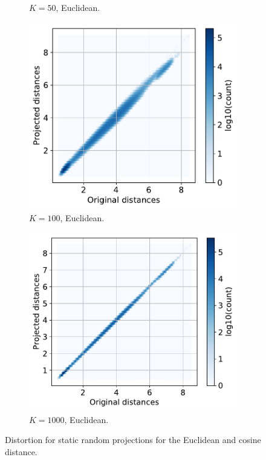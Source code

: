 \documentclass[11pt,onecolumn]{article}
\begin{document}
\begin{figure}[h!]
\begin{subfigure}[t]{0.29\textwidth}
				\caption{$K=50$, Euclidean.}
		\end{subfigure}
		\hfill
		\begin{subfigure}[t]{0.29\textwidth}
				\centering
				\includegraphics[width=\linewidth]{fig/sparse_projection_euclidean_k100.pdf}
				\caption{$K=100$, Euclidean.}
		\end{subfigure}
		\hfill
		\begin{subfigure}[t]{0.29\textwidth}
				\centering
				\includegraphics[width=\linewidth]{fig/sparse_projection_euclidean_k1000.pdf}
				\caption{$K=1000$, Euclidean.}
		\end{subfigure}
    \caption{Distortion for static random projections for the Euclidean and cosine distance.}
		\label{fig:distortion-static}
\end{figure}
\end{document}
